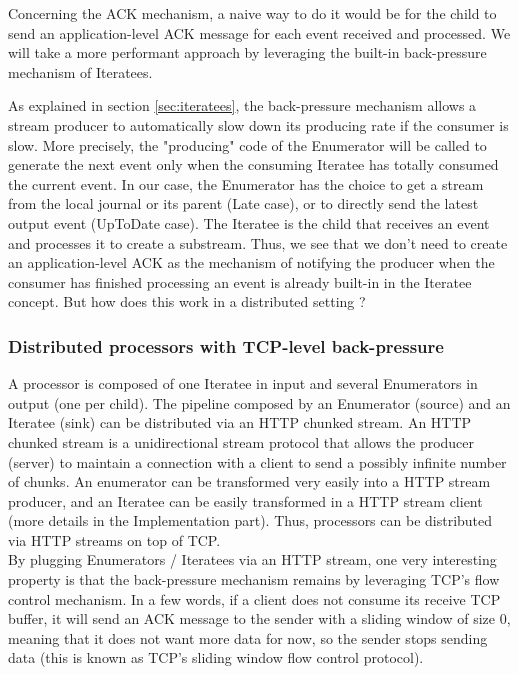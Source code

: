 Concerning the ACK mechanism, a naive way to do it would be for the child to send an application-level ACK message for each event received and processed. We will take
a more performant approach by leveraging the built-in back-pressure mechanism of Iteratees. 

As explained in section \ref{sec:iteratees}, the back-pressure mechanism allows a stream producer to automatically slow down its producing rate if the consumer is slow. 
More precisely, the "producing" code of the Enumerator will be called to generate the next event only when the consuming Iteratee has totally consumed the current event.
In our case, the Enumerator has the choice to get a stream from the local journal or its parent (Late case), or to directly send the latest output event (UpToDate case).
The Iteratee is the child that receives an event and processes it to create a substream.
Thus, we see that we don't need to create an application-level ACK as the mechanism of notifying the producer when the consumer has finished processing an event is already
built-in in the Iteratee concept. But how does this work in a distributed setting ?


\subsubsection{Distributed processors with TCP-level back-pressure}

A processor is composed of one Iteratee in input and several Enumerators in output (one per child). The pipeline composed by an Enumerator (source) and an Iteratee (sink) can
be distributed via an HTTP chunked stream. An HTTP chunked stream is a unidirectional stream protocol that allows the producer (server) to maintain a connection with a client to send a possibly infinite number of chunks. An enumerator can be transformed very easily into a HTTP stream producer, and an Iteratee can be easily transformed in a HTTP stream client (more details in the Implementation part). Thus, processors can be distributed via HTTP streams on top of TCP.
\\

By plugging Enumerators / Iteratees via an HTTP stream, one very interesting property is that the back-pressure mechanism remains by leveraging TCP's flow control mechanism. In a few words, if a client does not consume its receive TCP buffer, it will send an ACK message to the sender with a sliding window of size 0, meaning that it does not want more data for now, so the sender stops sending data (this is known as TCP's sliding window flow control protocol).

